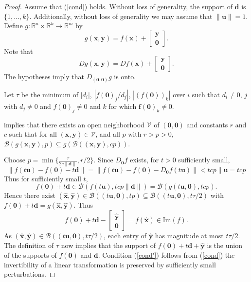 \documentclass[preprint,12pt]{elsarticle}
\begin{document}
\begin{proof}
Assume that (\ref{cond}) holds. 
Without loss of generality, the support of $\mathbf d$ is $\{1,\ldots, k\}$. Additionally, without loss of generality 
we may assume that $\|\mathbf u\|=1$.
Define $g: \mathbb{R}^n \times \mathbb{R}^k \rightarrow \mathbb{R}^m$ by 
\[g(\mathbf x, \mathbf y)= f(\mathbf x) +
\left[ \begin{array}{c} \mathbf y\\ \mathbf 0
\end{array} \right]. \]  Note that 
\[ 
Dg(\mathbf x, \mathbf y)=Df(\mathbf x) + \left[ \begin{array}{c} \mathbf y \\ \mathbf 0 
\end{array} \right].\]  
The hypotheses imply that $D_{(\mathbf 0,\mathbf 0)}g$ is onto.

Let 
$\tau$ be the minimum of $|d_i|$, $|f(\mathbf 0)_j/ d_j|$, $|(f(\mathbf 0))_k|$ over $i$
such that $d_i\neq 0$, $j$ with $d_j\neq 0$ and 
$f(\mathbf 0)_j \neq 0$ and $k$ for which $\mathbf f(\mathbf 0)_k\neq 0$.

 implies that there exists an open neighborhood $\mathcal{V}$ of $(\mathbf 0, \mathbf 0)$ and 
constants $r$ and $c$
such that for all $(\mathbf x, \mathbf y) \in \mathcal{V}$,
and all 
$p$ with $r>p>0$, $\mathcal{B}(g(\mathbf x, \mathbf y),p) \subseteq 
g(\mathcal{B}((\mathbf x,\mathbf y), cp))$.

Choose $p= \min \{\frac{\tau}{2c\|\mathbf d\|}, r/2\}$.
Since $D_{\mathbf 0}f$ exists, for $t>0$ sufficiently small, 
\[
\|f(t \mathbf u)-f(\mathbf 0) - t\mathbf d\|=
\|f(t \mathbf u)-f(\mathbf 0) - D_{\mathbf 0}f (t\mathbf u) \|<tcp\|\mathbf u=tcp
\]
Thus for sufficiently small $t$, 
 \[ f(\mathbf 0) + t\mathbf{d}\in 
 \mathcal{B}( f(t\mathbf u), tcp\|\mathbf d\|)=
 \mathcal{B}(g(t\mathbf u, \mathbf 0), tcp).\]
 Hence there exist $(\widehat{\mathbf{x}},  \widehat{\mathbf{y}}) \in \mathcal{B}((t\mathbf u, \mathbf 0), tp) \subseteq \mathcal{B}((t\mathbf u, \mathbf 0), t\tau/2)$
 with 
$ f(\mathbf 0)+ t\mathbf d= g(\widehat{\mathbf x},\widehat{\mathbf y})$.
Thus
 \[ f(\mathbf 0) + t\mathbf d-\left[ \begin{array}{c} \widehat{\mathbf y}\\ \mathbf 0\end{array} \right] =f(\widehat{\mathbf x}) \in \mbox{Im}(f).
 \] 
As $(\widehat{\mathbf x}, \widehat{\mathbf y}) \in \mathcal{B}((t\mathbf u, \mathbf 0), t\tau/2)$, each entry of $\widehat{\mathbf y}$ has magnitude at most $t\tau/2$.
The definition of $\tau$ now implies that 
the support of $f(\mathbf 0) + t\mathbf d + \widehat{\mathbf{y}}$ is the union of the supports of $f(\mathbf 0 )$ and $\mathbf d$. 
Condition (\ref{cond'}) follows from (\ref{cond})
the invertibility of a linear transformation is preserved by sufficiently small perturbations. 
\end{proof}
\end{document}
